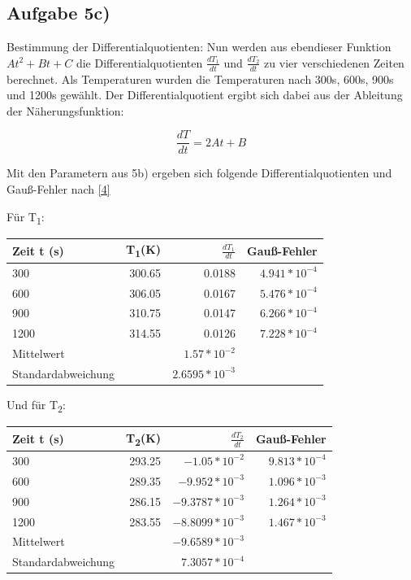 \documentclass[titlepage=firstcover, captions=tableheading]{scrartcl}
\begin{document}
\subsection{Aufgabe 5c)}
Bestimmung der Differentialquotienten: 
Nun werden aus ebendieser Funktion $At^2+Bt+C$ die Differentialquotienten $\frac{dT_1}{dt}$ und $\frac{dT_2}{dt}$  zu vier verschiedenen Zeiten berechnet. 
Als Temperaturen wurden die Temperaturen nach 300s, 600s, 900s und 1200s gewählt. 
Der Differentialquotient ergibt sich dabei aus der Ableitung der Näherungsfunktion: 

\begin{displaymath}
    \frac{dT}{dt}=2At+B
\end{displaymath}

\noindent Mit den Parametern aus 5b) ergeben sich folgende Differentialquotienten und Gauß-Fehler nach \eqref{4}

Für T\textsubscript{1}:
\begin{center}
    \begin{tabular}{
        l
        r
        r
        r
    }
        \toprule
        {Zeit t (s)} & {T\textsubscript{1}(K)} & {$\frac{dT_1}{dt} $} & {Gauß-Fehler} \\
        \midrule
        300 & 300.65 &  0.0188 & $4.941 * 10^{-4}$ \\
        600 & 306.05 &  0.0167 & $5.476 * 10^{-4}$\\
        900 & 310.75 &  0.0147 & $6.266 * 10^{-4}$\\
        1200 & 314.55 & 0.0126 & $7.228 * 10^{-4}$ \\
        \midrule
        Mittelwert & & $1.57*10^{-2}$ & \\
        Standardabweichung & & $2.6595*10^{-3}$ \\
        \bottomrule
    \end{tabular}
    \end{center}

    Und  für T\textsubscript{2}:
    \begin{center}
        \begin{tabular}{
            l
            r
            r
            r
        }
            \toprule
            {Zeit t (s)} & {T\textsubscript{2}(K)} & {$\frac{dT_2}{dt} $} & {Gauß-Fehler} \\
            \midrule
            300 & 293.25 & $-1.05*10^{-2}$ & $9.813 * 10^{-4}$\\
            600 & 289.35 & $-9.952*10^{-3}$ & $1.096 * 10^{-3}$\\
            900 & 286.15 & $-9.3787*10^{-3}$ & $1.264 * 10^{-3}$\\
            1200 & 283.55 & $-8.8099*10^{-3}$ & $1.467 * 10^{-3}$\\
            \midrule
            Mittelwert & & $-9.6589*10^{-3}$ & \\
            Standardabweichung & & $7.3057*10^{-4}$ & \\
            \bottomrule
        \end{tabular}
        \end{center}
\end{document}
